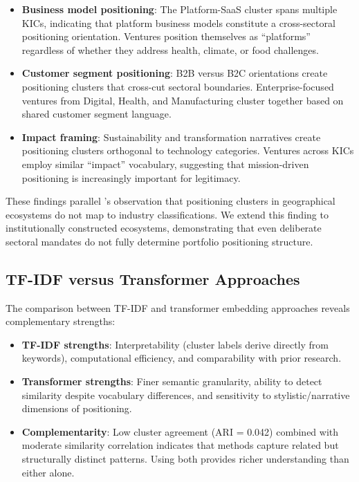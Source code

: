 \documentclass[../main.tex]{subfiles}
\begin{document}
\begin{itemize}
    \item \textbf{Business model positioning}: The Platform-SaaS cluster spans multiple KICs, indicating that platform business models constitute a cross-sectoral positioning orientation. Ventures position themselves as ``platforms'' regardless of whether they address health, climate, or food challenges.

    \item \textbf{Customer segment positioning}: B2B versus B2C orientations create positioning clusters that cross-cut sectoral boundaries. Enterprise-focused ventures from Digital, Health, and Manufacturing cluster together based on shared customer segment language.

    \item \textbf{Impact framing}: Sustainability and transformation narratives create positioning clusters orthogonal to technology categories. Ventures across KICs employ similar ``impact'' vocabulary, suggesting that mission-driven positioning is increasingly important for legitimacy.
\end{itemize}

These findings parallel \cite{basole2019visual}'s observation that positioning clusters in geographical ecosystems do not map to industry classifications. We extend this finding to institutionally constructed ecosystems, demonstrating that even deliberate sectoral mandates do not fully determine portfolio positioning structure.

\subsection{TF-IDF versus Transformer Approaches}

The comparison between TF-IDF and transformer embedding approaches reveals complementary strengths:
\begin{itemize}
    \item \textbf{TF-IDF strengths}: Interpretability (cluster labels derive directly from keywords), computational efficiency, and comparability with prior research.

    \item \textbf{Transformer strengths}: Finer semantic granularity, ability to detect similarity despite vocabulary differences, and sensitivity to stylistic/narrative dimensions of positioning.

    \item \textbf{Complementarity}: Low cluster agreement (ARI = 0.042) combined with moderate similarity correlation indicates that methods capture related but structurally distinct patterns. Using both provides richer understanding than either alone.
\end{itemize}
\end{document}

